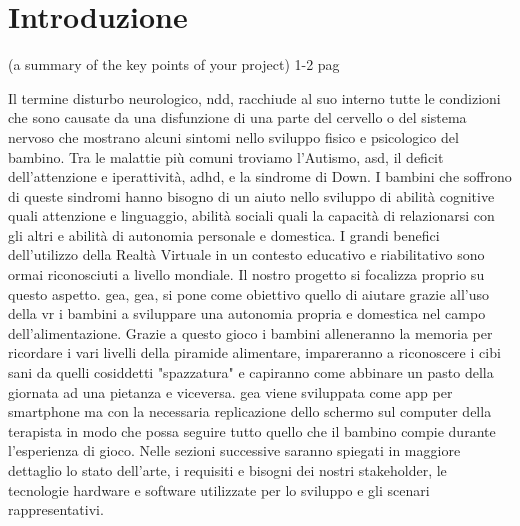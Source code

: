 \section{Introduzione} \label{sec:intro}

(a summary of the key points of your project) 1-2 pag

Il termine disturbo neurologico, \acs{ndd}, racchiude al suo interno tutte le condizioni che sono causate da una disfunzione di una parte del cervello o del sistema nervoso che mostrano alcuni sintomi nello sviluppo fisico e psicologico del bambino. Tra le malattie più comuni troviamo l'Autismo, \acs{asd}, il deficit dell'attenzione e iperattività, \acs{adhd}, e la sindrome di Down. I bambini che soffrono di queste sindromi hanno bisogno di un aiuto nello sviluppo di abilità cognitive quali attenzione e linguaggio, abilità sociali quali la capacità di relazionarsi con gli altri e abilità di autonomia personale e domestica. I grandi benefici dell'utilizzo della Realtà Virtuale in un contesto educativo e riabilitativo sono ormai riconosciuti a livello mondiale. Il nostro progetto si focalizza proprio su questo aspetto. \acs{gea}, \acl{gea}, si pone come obiettivo quello di aiutare grazie all'uso della \acs{vr} i bambini a sviluppare una autonomia propria e domestica nel campo dell'alimentazione. Grazie a questo gioco i bambini alleneranno la memoria per ricordare i vari livelli della piramide alimentare, impareranno a riconoscere i cibi sani da quelli cosiddetti "spazzatura" e capiranno come abbinare un pasto della giornata ad una pietanza e viceversa. \acs{gea} viene sviluppata come app per smartphone ma con la necessaria replicazione dello schermo sul computer della terapista in modo che possa seguire tutto quello che il bambino compie durante l'esperienza di gioco. Nelle sezioni successive saranno spiegati in maggiore dettaglio lo stato dell'arte, i requisiti e bisogni dei nostri stakeholder, le tecnologie hardware e software utilizzate per lo sviluppo e gli scenari rappresentativi.